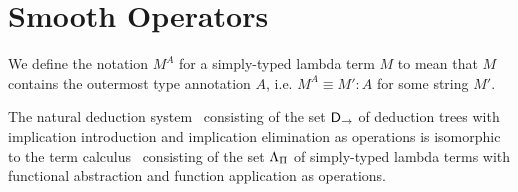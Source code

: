 \section{Smooth Operators}
\label{section:bijection}

\begin{definition}
We define the notation $M^{A}$ for a simply-typed lambda term $M$ to mean that
$M$ contains the outermost type annotation $A$, i.e. $M^A \equiv M':A$ for some
string $M'$.
\end{definition}

\begin{theorem}
The natural deduction system \implnpi\ consisting of the set $\mathsf{D}_\to$ of
deduction trees with implication introduction and implication elimination as
operations is isomorphic to the term calculus \stlambda\ consisting of the set
$\Lambda_\Pi$ of simply-typed lambda terms with functional abstraction and
function application as operations.
\end{theorem}


